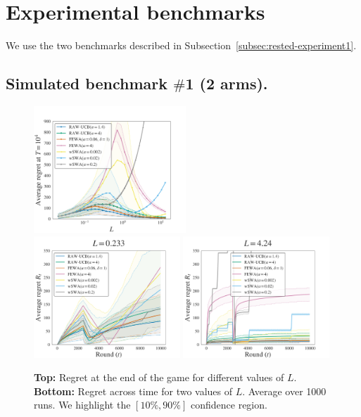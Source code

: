 \section{Experimental benchmarks}
\label{sec:rested-experiment}
We use the two benchmarks described in Subsection~\ref{subsec:rested-experiment1}.

\subsection{Simulated benchmark $\#$1 (2 arms).}
\begin{figure}[ht]
\centering
\includegraphics[clip, width= 0.51\textwidth]{2.1Rested/fig/fig1A_main.pdf}
\includegraphics[clip, width= 0.49\textwidth]{2.1Rested/fig/fig1B_main.pdf}
\includegraphics[clip, width= 0.49\textwidth]{2.1Rested/fig/fig1C_main.pdf}
\caption{\textbf{Top:} Regret at the end of the game for different values of $L$. \textbf{Bottom:} Regret across time for two values of $L$. Average over 1000 runs. We highlight the $\left[10\%, 90\%\right]$ confidence region.}
\label{fig:rested-exp1}
\end{figure}

